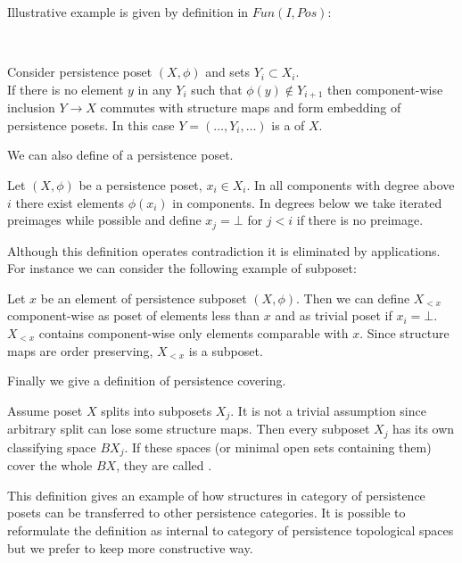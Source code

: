 Illustrative example is given by definition in $Fun(I, Pos)$:\\

\begin{definition} ~ \par
  Consider persistence poset $(X,\phi)$ and sets $Y_i \subset X_i$.\\

  If there is no element $y$ in any $Y_i$ such that $\phi(y) \not\in Y_{i+1}$ then component-wise inclusion $Y \to X$ commutes with structure maps and form embedding of persistence posets. In this case $Y=(\ldots,Y_i,\ldots)$ is a  of $X$.
\end{definition}

We can also define  of a persistence poset.
\begin{definition}
  Let $(X,\phi)$ be a persistence poset, $x_i \in X_i$. In all components with degree above $i$ there exist elements $\phi(x_i)$ in components. In degrees below we take iterated preimages while possible and define $x_j = \bot$ for $j < i$ if there is no preimage.
\end{definition}

Although this definition operates contradiction it is eliminated by applications.\\
For instance we can consider the following example of subposet:
\begin{example}
  Let $x$ be an element of persistence subposet $(X, \phi)$. Then we can define $X_{<x}$ component-wise as poset of elements less than $x$ and as trivial poset if $x_i = \bot$.\\

  $X_{<x}$ contains component-wise only elements comparable with $x$. Since structure maps are order preserving, $X_{<x}$ is a subposet.
\end{example}

Finally we give a definition of persistence covering.\\

\begin{definition}
  Assume poset $X$ splits into subposets $X_j$. It is not a trivial assumption since arbitrary split can lose some structure maps. Then every subposet $X_j$ has its own classifying space $BX_j$. If these spaces (or minimal open sets containing them) cover the whole $BX$, they are called .
\end{definition}

This definition gives an example of how structures in category of persistence posets can be transferred to other persistence categories. It is possible to reformulate the definition as internal to category of persistence topological spaces but we prefer to keep more constructive way.
